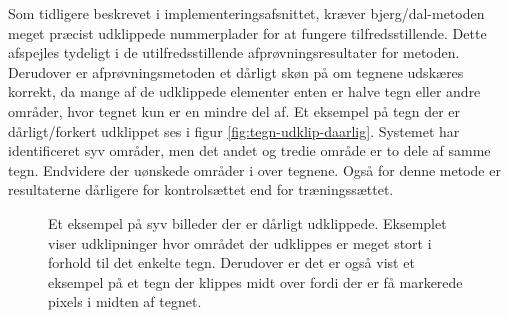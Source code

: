 Som tidligere beskrevet i implementeringsafsnittet, kræver bjerg/dal-metoden meget præcist udklippede nummerplader for at fungere tilfredsstillende. Dette afspejles tydeligt i de utilfredsstillende afprøvningsresultater for metoden. Derudover er afprøvningsmetoden et dårligt skøn på om tegnene udskæres korrekt, da mange af de udklippede elementer enten er halve tegn eller andre områder, hvor tegnet kun er en mindre del af. Et eksempel på tegn der er dårligt/forkert udklippet ses i figur \vref{fig:tegn-udklip-daarlig}. Systemet har identificeret syv områder, men det andet og tredie område er to dele af samme tegn. Endvidere der uønskede områder i over tegnene. Også for denne metode er resultaterne dårligere for kontrolsættet end for træningssættet.

\begin{figure}[htp]
  \centering
  \begin{minipage}[c]{8 cm}
	\end{minipage}
  \caption{Et eksempel på syv billeder der er dårligt udklippede. Eksemplet viser udklipninger hvor området der udklippes er meget stort i forhold til det enkelte tegn. Derudover er det er også vist et eksempel på et tegn der klippes midt over fordi der er få markerede pixels i midten af tegnet.}
  \label{fig:tegn-udklip-daarlig}
\end{figure}


